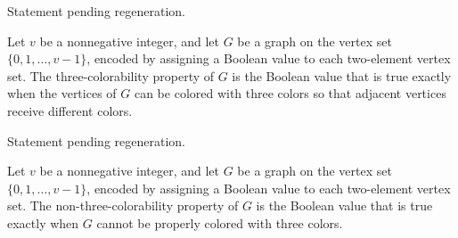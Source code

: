 \begin{theorem}
\label{FABL.connectivity_isMonotoneGraphProperty}
\leanok
{}
Statement pending regeneration.
\end{theorem}

\begin{definition}
\label{FABL.threeColorableGraphProperty}
\leanok
{}
Let $v$ be a nonnegative integer, and let $G$ be a graph on the vertex set
$\{0,1,\ldots,v-1\}$, encoded by assigning a Boolean value to each two-element vertex
set. The three-colorability property of $G$ is the Boolean value that is true exactly
when the vertices of $G$ can be colored with three colors so that adjacent vertices
receive different colors.
\end{definition}

\begin{theorem}
\label{FABL.threeColorable_isGraphProperty}
\leanok
{}
Statement pending regeneration.
\end{theorem}

\begin{definition}
\label{FABL.notThreeColorableGraphProperty}
\leanok
{}
Let $v$ be a nonnegative integer, and let $G$ be a graph on the vertex set
$\{0,1,\ldots,v-1\}$, encoded by assigning a Boolean value to each two-element vertex
set. The non-three-colorability property of $G$ is the Boolean value that is true
exactly when $G$ cannot be properly colored with three colors.
\end{definition}

